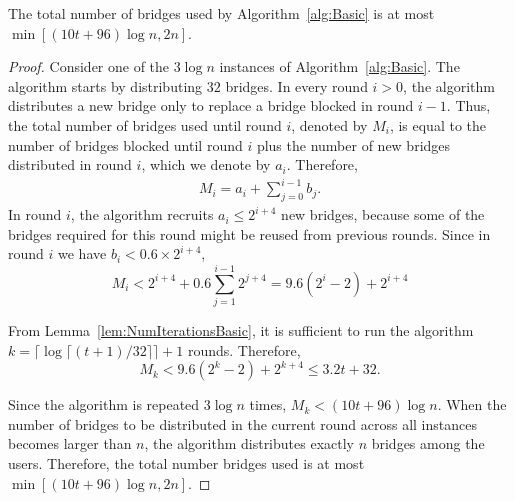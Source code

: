 \documentclass[a4paper,UKenglish]{lipics-v2016}
\newcommand{\sfsize}{\fontsize{0.68\baselineskip}{0.68\baselineskip}\selectfont}
\newcommand{\sans}[1]{\textbf{\textsf{\sfsize \mbox{#1}}}}
\begin{document}
\begin{lemma}[\sans{Bridge Cost}] \label{lem:NumBridgesBasic}
	The total number of bridges used by Algorithm~\ref{alg:Basic} is at most $\min\left[{(10t + 96)\log{n}}, 2n\right]$. %
\end{lemma}
\begin{proof}
	Consider one of the $3\log{n}$ instances of Algorithm~\ref{alg:Basic}. The algorithm starts by distributing  $32$ bridges. In every round ${i > 0}$, the algorithm distributes a new bridge only to replace a bridge blocked in round ${i-1}$. Thus, the total number of bridges used until round $i$, denoted by $M_i$, is equal to the number of bridges blocked until round $i$ plus the number of new bridges distributed in round $i$, which we denote by $a_i$. Therefore,
	\begin{align}
	M_i = a_i + \sum_{j=0}^{i-1} b_j. \label{eq:NumBridges}
	\end{align}
	In round $i$, the algorithm recruits ${a_i \leq 2^{i+4}}$ new bridges, because some of the bridges required for this round might be reused from previous rounds. Since in round $i$ we have ${b_i < 0.6 \times 2^{i+4}}$,
	\[M_i < 2^{i+4} + 0.6\sum_{j=1}^{i-1} 2^{j+4} = 9.6(2^i - 2) + 2^{i+4}\]
	
	From Lemma~\ref{lem:NumIterationsBasic}, it is sufficient to run the algorithm ${k = \lceil \log{\lceil (t+1)/32 \rceil} \rceil + 1}$ rounds. Therefore,	
	\[M_k < 9.6(2^k - 2) + 2^{k+4} \leq 3.2t + 32.\]
	
	Since the algorithm is repeated $3\log{n}$ times, $M_k < {(10t + 96)\log{n}}$. When the number of bridges to be distributed in the current round across all instances becomes larger than $n$, the algorithm distributes exactly $n$ bridges among the users. Therefore, the total number bridges used is at most $\min\left[{(10t + 96)\log{n}}, 2n\right]$. %
\end{proof}
\end{document}
